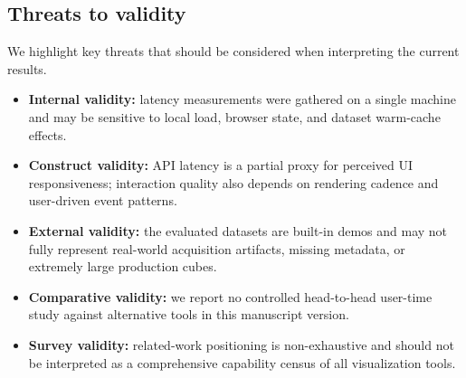 \documentclass[11pt]{article}
\begin{document}
\subsection{Threats to validity}
We highlight key threats that should be considered when interpreting the current results.
\begin{itemize}[leftmargin=1.5em]
  \item \textbf{Internal validity:} latency measurements were gathered on a single machine and may be sensitive to local load, browser state, and dataset warm-cache effects.
  \item \textbf{Construct validity:} API latency is a partial proxy for perceived UI responsiveness; interaction quality also depends on rendering cadence and user-driven event patterns.
  \item \textbf{External validity:} the evaluated datasets are built-in demos and may not fully represent real-world acquisition artifacts, missing metadata, or extremely large production cubes.
  \item \textbf{Comparative validity:} we report no controlled head-to-head user-time study against alternative tools in this manuscript version.
  \item \textbf{Survey validity:} related-work positioning is non-exhaustive and should not be interpreted as a comprehensive capability census of all visualization tools.
\end{itemize}
\end{document}
